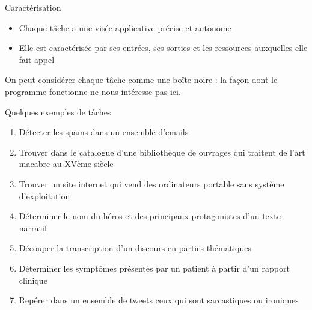 \documentclass[hyperref={unicode}, xcolor={svgnames}]{beamer}
\begin{document}
\begin{frame}{Caractérisation}
    \begin{itemize}
        \item Chaque tâche a une visée applicative précise et autonome
        \item Elle est caractérisée par ses entrées, ses sorties et les ressources auxquelles elle fait appel
    \end{itemize}

    \begin{figure}
    \end{figure}

    On peut considérer chaque tâche comme une boîte noire : la façon dont le programme fonctionne ne nous intéresse pas ici.
\end{frame}

\begin{frame}{Quelques exemples de tâches}
    \begin{enumerate}
        \item Détecter les spams dans un ensemble d'emails
        \item Trouver dans le catalogue d'une bibliothèque de ouvrages qui traitent de l'art macabre au XVème siècle
        \item Trouver un site internet qui vend des ordinateurs portable sans système d'exploitation
        \item Déterminer le nom du héros et des principaux protagonistes d'un texte narratif
        \item Découper la transcription d'un discours en parties thématiques
        \item Déterminer les symptômes présentés par un patient à partir d'un rapport clinique
        \item Repérer dans un ensemble de tweets ceux qui sont sarcastiques ou ironiques
    \end{enumerate}
\end{frame}
\end{document}
